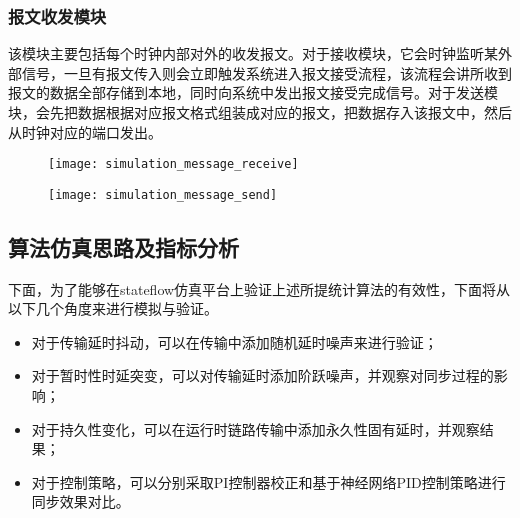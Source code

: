 \subsubsection{报文收发模块}
该模块主要包括每个时钟内部对外的收发报文。对于接收模块，它会时钟监听某外部信号，一旦有报文传入则会立即触发系统进入报文接受流程，该流程会讲所收到报文的数据全部存储到本地，同时向系统中发出报文接受完成信号。对于发送模块，会先把数据根据对应报文格式组装成对应的报文，把数据存入该报文中，然后从时钟对应的端口发出。
\begin{figure}[!hbp]
  \centering
  \begin{minipage}[b]{1\textwidth}
    \captionstyle{\centering}
    \centering
    \texttt{[image: simulation\_message\_receive]}
  \end{minipage}     
\end{figure}
\begin{figure}[!hbp]
  \centering
  \begin{minipage}[b]{1\textwidth}
    \captionstyle{\centering}
    \centering
    \texttt{[image: simulation\_message\_send]}
  \end{minipage}     
\end{figure}

\subsection{算法仿真思路及指标分析}
下面，为了能够在stateflow仿真平台上验证上述所提统计算法的有效性，下面将从以下几个角度来进行模拟与验证。
\begin{itemize}[noitemsep,topsep=0pt,parsep=0pt,partopsep=0pt]
  \item 对于传输延时抖动，可以在传输中添加随机延时噪声来进行验证；
  \item 对于暂时性时延突变，可以对传输延时添加阶跃噪声，并观察对同步过程的影响；
  \item 对于持久性变化，可以在运行时链路传输中添加永久性固有延时，并观察结果；
  \item 对于控制策略，可以分别采取PI控制器校正和基于神经网络PID控制策略进行同步效果对比。
\end{itemize}

